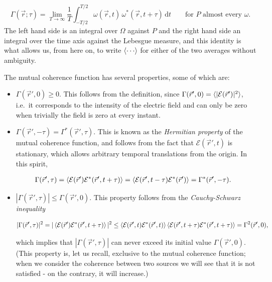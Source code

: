	\begin{equation}\label{eq:GammaTimeAverage}
		\Gamma(\vec{r};\tau) = \lim_{T\to\infty}\frac{1}{T}\int_{-T/2}^{T/2} \omega(\vec{r},t)\, \omega^*(\vec{r},t+\tau)\,\mathrm{d}t
		\qquad \text{for } P \text{ almost every } \omega .
	\end{equation}
	The left hand side is an integral over $\Omega$ against $P$ and the right hand side an
	integral over the time axis against the Lebesgue measure, and this identity is what
	allows us, from here on, to write $\braket{\cdots}$ for either of the two averages
	without ambiguity.

	The mutual coherence function has several properties, some of which are:

	\begin{itemize}
		\item[a)] $\Gamma(\vec{r}',0) \geq 0$. This follows from the definition, since $\Gamma(\vec{r}',0) = \braket{|\mathcal{E}(\vec{r}')|^2}$, i.e.\ it corresponds to the intensity of the electric field and can only be zero when trivially the field is zero at every instant.

		\item[b)] $\Gamma(\vec{r}',-\tau) = \Gamma^*(\vec{r}',\tau)$. This is known as the \textit{Hermitian property} of the mutual coherence function, and follows from the fact that $\mathcal{E}(\vec{r}',t)$ is stationary, which allows arbitrary temporal translations from the origin. In this spirit,

		\begin{align}
			& \Gamma(\vec{r}',\tau) = \braket{\mathcal{E}(\vec{r}')\mathcal{E}^*(\vec{r}',t + \tau)} = \braket{\mathcal{E}(\vec{r}',t-\tau)\mathcal{E}^*(\vec{r}')} = \Gamma^*(\vec{r}',-\tau).
		\end{align}

		\item[c)] $|\Gamma(\vec{r}',\tau)| \leq \Gamma(\vec{r}',0)$. This property follows from the \textit{Cauchy-Schwarz inequality}

		\begin{equation}
			|\Gamma(\vec{r}',\tau)|^2 = | \braket{\mathcal{E}(\vec{r}')\mathcal{E}^*(\vec{r}',t+\tau)} |^2 \leq  \braket{\mathcal{E}(\vec{r}',t)\mathcal{E}^*(\vec{r}',t)} \braket{\mathcal{E}(\vec{r}',t+\tau)\mathcal{E}^*(\vec{r}',t+\tau)} = \Gamma^2(\vec{r}',0),
		\end{equation}

		which implies that $|\Gamma(\vec{r}',\tau)|$ can never exceed its initial value $\Gamma(\vec{r}',0)$. (This property is, let us recall, exclusive to the mutual coherence function; when we consider the coherence between two sources we will see that it is not satisfied - on the contrary, it will increase.)


\end{itemize}
